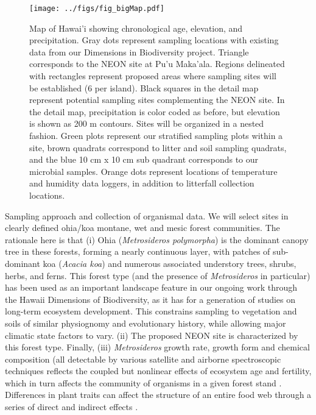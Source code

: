 \documentclass[11pt]{article}
\makeatletter
\renewcommand{\paragraph}{\@startsection{paragraph}{4}{\z@}
  {1ex \@plus 1ex \@minus .2ex}{-1em}
  {\normalfont\normalsize\it}
}
\makeatother
\begin{document}
\begin{figure}[!htb]
  \centering
  \texttt{[image: ../figs/fig\_bigMap.pdf]}
  \caption{Map of Hawai'i showing chronological age, elevation, and
    precipitation.  Gray dots represent sampling locations with
    existing data from our Dimensions in Biodiversity project.
    Triangle corresponds to the NEON site at Pu'u Maka'ala.  Regions
    delineated with rectangles represent proposed areas where sampling
    sites will be established (6 per island). Black squares in the
    detail map represent potential sampling sites complementing the
    NEON site.  In the detail map, precipitation is color coded as
    before, but elevation is shown as 200 m contours. Sites will be
    organized in a nested fashion.  Green plots represent our
    stratified sampling plots within a site, brown quadrats correspond
    to litter and soil sampling quadrats, and the blue 10 cm x 10 cm
    sub quadrant corresponds to our microbial samples.  Orange dots
    represent locations of temperature and humidity data loggers, in
    addition to litterfall collection locations.}
  \label{fig:map}
\end{figure}


\paragraph{Sampling approach and collection of organismal data.}
We will select sites in clearly defined ohia/koa montane, wet and
mesic forest communities. The rationale here is that (i) Ohia
({\it Metrosideros polymorpha}) is the dominant canopy tree in these
forests, forming a nearly continuous layer, with patches of
sub-dominant koa ({\it Acacia koa}) and numerous associated understory
trees, shrubs, herbs, and ferns. This forest type (and the presence of
{\it Metrosideros} in particular) has been used as an important landscape
feature in our ongoing work through the Hawaii Dimensions of
Biodiversity, as it has for a generation of studies on long-term
ecosystem development. This constrains sampling to vegetation and
soils of similar physiognomy and evolutionary history, while allowing
major climatic state factors to vary. (ii) The proposed NEON site is
characterized by this forest type. Finally, (iii) {\it Metrosideros} growth
rate, growth form and chemical composition (all detectable by various
satellite and airborne spectroscopic techniques \citep{asner2006,
  asner2009, asner2012} reflects the coupled but nonlinear effects of
ecosystem age and fertility, which in turn affects the community of
organisms in a given forest stand \citep{crews1995,
  gruner2007}. Differences in plant traits can affect the structure of
an entire food web through a series of direct and indirect effects
\citep{gruner2005, bukovinszky2008}.
\end{document}

